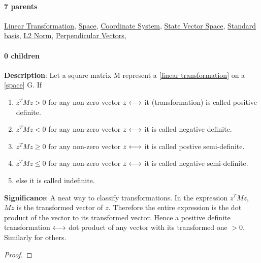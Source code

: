 \documentclass[../main.tex]{subfiles}
\begin{document}
\paragraph{7 parents} \hyperref[statement:Linear Transformation]{Linear Transformation}, \hyperref[statement:Space]{Space}, \hyperref[statement:Coordinate System]{Coordinate System}, \hyperref[statement:State Vector Space]{State Vector Space}, \hyperref[statement:Standard basis]{Standard basis}, \hyperref[statement:L2 Norm]{L2 Norm}, \hyperref[statement:Perpendicular Vectors]{Perpendicular Vectors}, 
\paragraph{0 children} 




\begin{statement}
\label{statement:Definiteness}\hspace*{0pt}\par
\end{statement}
\textbf{Description}:
Let a square matrix M represent a [\hyperref[statement:Linear Transformation]{linear transformation}] on a [\hyperref[statement:Space]{space}] G. If
\begin{enumerate}[nolistsep]
  \item $z^TMz > 0$ for any non-zero vector $z \longleftrightarrow$ it (transformation) is called positive definite.
  \item $z^TMz < 0$ for any non-zero vector $z \longleftrightarrow$ it is called negative definite.
  \item $z^TMz \ge 0$ for any non-zero vector $z \longleftrightarrow$ it is called postive semi-definite.
  \item $z^TMz \le 0$ for any non-zero vector $z \longleftrightarrow$ it is called negative semi-definite.
  \item else it is called indefinite.
\end{enumerate}
\par
{\color{magenta} \textbf{Significance}:
A neat way to classify transformations.
In the expression $z^TMz$, $Mz$ is the transformed vector of $z$.
Therefore the entire expression is the dot product of the vector to its transformed vector.
Hence a positive definite transformation $\longleftrightarrow$ dot product of any vector with its transformed one $> 0$.
Similarly for others.
\par}
\begin{proof}
\proofbydefinition
\end{proof}\par
\end{document}

